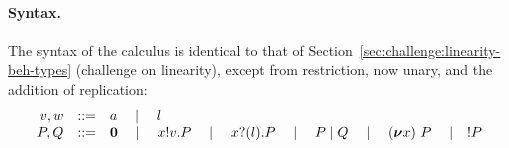 \paragraph{Syntax.}
The syntax of the calculus is identical to that of
Section~\ref{sec:challenge:linearity-beh-types} (challenge on
linearity), except from restriction, now unary, and the addition of
replication:
\begin{displaymath}
  \begin{array}{rcl}
    v,w & ::= & a \quad\mid\quad l \\
    P,Q & ::=& \bm{0}
               \quad \mid\quad x ! v . P
               \quad \mid\quad x ? (l) . P
               \quad \mid\quad P \mid Q
               \quad \mid\quad (\bm{\nu} x)~{P}
               \quad \mid\quad !P
  \end{array}
\end{displaymath}
